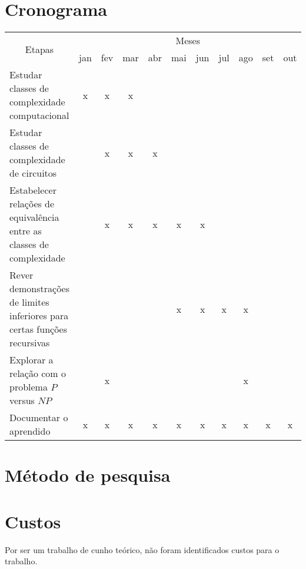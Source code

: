 \documentclass[12pt]{article}
\begin{document}
\section{Cronograma}

    \begin{tabularx}{\linewidth}{|X|*{10}{c|}}
        \hline
        \multicolumn{1}{|c|}{\multirow{2}{*}{Etapas}} & \multicolumn{10}{|c|}{Meses}\\ \cline{2-11}
        & jan & fev & mar & abr & mai & jun & jul & ago & set & out \\ \hline

        Estudar classes de complexidade computacional
        &  x  &  x  &  x  &     &     &     &     &     &     &     \\ \hline

        Estudar classes de complexidade de circuitos
        &     &  x  &  x  &  x  &     &     &     &     &     &     \\ \hline

        Estabelecer relações de equivalência entre as classes de complexidade
        &     &  x  &  x  &  x  &  x  &  x  &     &     &     &     \\ \hline

        Rever demonstrações de limites inferiores para certas funções recursivas
        &     &     &     &     &  x  &  x  &  x  &  x  &     &     \\ \hline

        Explorar a relação com o problema $P$ versus $NP$
        &     &  x  &     &     &     &     &     &  x  &     &     \\ \hline

        Documentar o aprendido
        &  x  &  x  &  x  &  x  &  x  &  x  &  x  &  x  &  x  &  x  \\ \hline

    \end{tabularx}

\section{Método de pesquisa}
    \blindtext[3]

\section{Custos}
    Por ser um trabalho de cunho teórico, não foram identificados custos para o trabalho.
\end{document}
